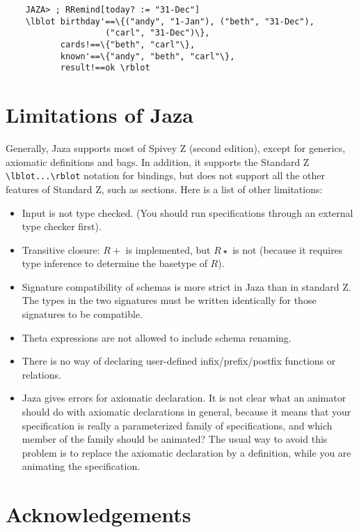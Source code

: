 \documentclass[11pt]{article}
\newcommand{\Jaza}{Jaza}
\begin{document}
\begin{verbatim}
    JAZA> ; RRemind[today? := "31-Dec"]
    \lblot birthday'==\{("andy", "1-Jan"), ("beth", "31-Dec"),
                    ("carl", "31-Dec")\},
           cards!==\{"beth", "carl"\}, 
           known'==\{"andy", "beth", "carl"\}, 
           result!==ok \rblot
\end{verbatim}


\section{Limitations of {\Jaza}} \label{sec:limitations}

Generally, {\Jaza} supports most of Spivey Z (second edition),
except for generics, axiomatic definitions and bags.  In addition,
it supports the Standard Z \verb!\lblot...\rblot! notation for
bindings, but does not support all the other features of Standard Z,
such as sections.
Here is a list of other limitations:
\begin{itemize}
\item Input is not type checked.  (You should run specifications
  through an external type checker first).
\item Transitive closure: $R\plus$ is implemented, but $R\star$ is not
  (because it requires type inference to determine the basetype of $R$).
\item Signature compatibility of schemas is more strict in
  {\Jaza} than in standard Z.  The types in the two signatures
  must be written identically for those signatures to be compatible.
\item Theta expressions are not allowed to include schema renaming.
\item There is no way of declaring user-defined infix/prefix/postfix 
  functions or relations.
\item {\Jaza} gives errors for axiomatic declaration.  It is not
  clear what an animator should do with axiomatic declarations in general, 
  because it means that your specification is really a parameterized
  family of specifications, and which member of the family should be animated?
  The usual way to avoid this problem is to replace the axiomatic declaration
  by a definition, while you are animating the specification.
\end{itemize}

\section*{Acknowledgements}
\end{document}
